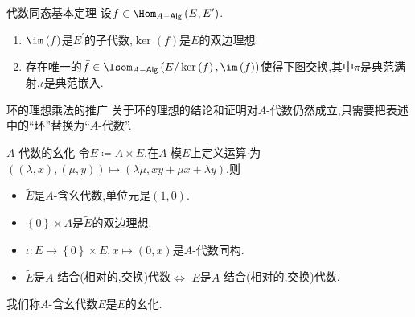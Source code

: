 \begin{proposition}{代数同态基本定理}{}
	设$f\in\Hom_{A-\mathsf{Alg}}\left(E,E^{\prime}\right)$.
	\begin{enumerate}
		\item $\im\left(f\right)$是$E^{\prime}$的子代数,$\ker\left(f\right)$是$E$的双边理想.
		\item 存在唯一的$\bar{f}\in\Isom_{A-\mathsf{Alg}}\left(E/\ker\left(f\right),\im\left(f\right)\right)$使得下图交换,其中$\pi$是典范满射,$\iota$是典范嵌入.
		\begin{center}
		\end{center}
	\end{enumerate}
\end{proposition}

\begin{remark}{环的理想乘法的推广}{}
	关于环的理想的结论和证明对$A$-代数仍然成立,只需要把表述中的``环''替换为``$A$-代数''.
\end{remark}

\begin{definition}{$A$-代数的幺化}{}
	令$\tilde{E}\coloneq A\times E$.在$A$-模$\tilde{E}$上定义运算$\cdot$为$\left(\left(\lambda,x\right),\left(\mu,y\right)\right)\mapsto\left(\lambda\mu,xy+\mu x+\lambda y\right)$,则
	\begin{itemize}
		\item $\tilde{E}$是$A$-含幺代数,单位元是$\left(1,0\right)$.
		\item $\left\{0\right\}\times A$是$\tilde{E}$的双边理想.
		\item $\iota:E\to\left\{0\right\}\times E,x\mapsto\left(0,x\right)$是$A$-代数同构.
		\item $\tilde{E}$是$A$-结合(相对的,交换)代数$\iff$ $E$是$A$-结合(相对的,交换)代数.
	\end{itemize}
	我们称$A$-含幺代数$\tilde{E}$是$E$的幺化.
\end{definition}





